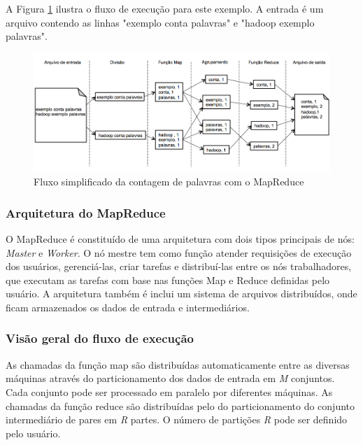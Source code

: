 A Figura \ref{fig:Mapreduceexemplo} ilustra o fluxo de execução para este exemplo. A entrada é um arquivo contendo as linhas "exemplo conta palavras" e "hadoop exemplo palavras".

\begin{figure}[htb]
\centering
\includegraphics[width=\textwidth]{figuras/mrexemplo.png}
\caption{Fluxo simplificado da contagem de palavras com o MapReduce}
\label{fig:Mapreduceexemplo}
\end{figure}

\subsubsection{Arquitetura do MapReduce}
O MapReduce é constituído de uma arquitetura com dois tipos principais de nós: \textit{Master} e \textit{Worker}. O nó mestre tem como função atender requisições de execução dos usuários, gerenciá-las, criar tarefas e distribuí-las entre os nós trabalhadores, que executam as tarefas com base nas funções Map e Reduce definidas pelo usuário.
A arquitetura também é inclui um sistema de arquivos distribuídos, onde ficam armazenados os dados de entrada e intermediários.



\subsubsection{Visão geral do fluxo de execução}


As chamadas da função map são distribuídas automaticamente entre as diversas máquinas através do particionamento dos dados de entrada em \textit{M} conjuntos. Cada conjunto pode ser processado em paralelo por diferentes máquinas. As chamadas da função reduce são distribuídas pelo do particionamento do conjunto intermediário de pares em \textit{R} partes. O número de partições \textit{R} pode ser definido pelo usuário.

